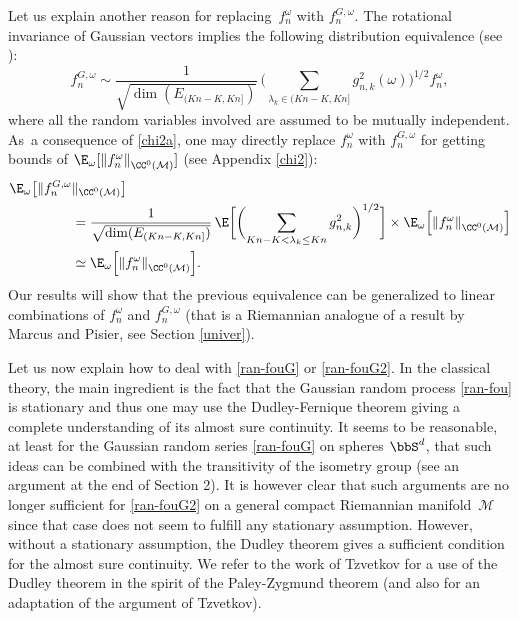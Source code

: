 Let us explain another reason for replacing~$f_n^\omega$ with $f_n^{G,\omega}$. The rotational invariance of Gaussian vectors implies the following distribution equivalence (see \cite[p.\,2731]{imek-aif}):
\begin{equation}\label{chi2a}
f_n^{G,\omega} \sim \frac{1}{\sqrt{\dim(E_{(Kn-K,Kn]})}}\,\biggl(\sum_{\lambda_k\in (Kn-K,Kn]} g_{n,k}^2(\omega)\biggr)^{1/2} f_n^\omega,
\end{equation}
where all the random variables involved are assumed to be mutually independent.
As~a consequence of \eqref{chi2a}, one may directly replace $f_n^{\omega}$ with $f_n^{G,\omega}$ for getting bounds of $\E_\omega[\left\Vert f_n^\omega \right\Vert_{\CC^0(\mathcal{M})}]$ (see Appendix \ref{chi2}):
\begin{align*}\nonumber
\E_{\omega}\bigl[\Vert f_n^{G,\omega}&\Vert_{\CC^0{(\mathcal{M})}} \bigr]\\
& = \frac{1}{\sqrt{\dim(E_{(Kn-K,Kn]})}}\,\E\biggl[\biggl(\sum_{Kn-K<\lambda_k\leq Kn} g_{n,k}^2\biggr)^{1/2} \biggr]\times \E_\omega\Bigl[\left\Vert f_n^{\omega}\right\Vert_{\CC^0{(\mathcal{M})}} \Bigr]\\
& \simeq \E_{\omega}\Bigl[\left\Vert f_n^{\omega}\right\Vert_{\CC^0{(\mathcal{M})}} \Bigr].
\end{align*}
Our results will show that the previous equivalence can be generalized to linear combinations of $f_n^\omega$ and $f_n^{G,\omega}$ (that is a Riemannian analogue of a result by Marcus and Pisier, see Section \ref{univer}).

Let us now explain how to deal with \eqref{ran-fouG} or \eqref{ran-fouG2}.
In the classical theory, the main ingredient is the fact that the Gaussian random process \eqref{ran-fou} is stationary and thus one may use the Dudley-Fernique theorem giving a complete understanding of its almost sure continuity.
It seems to be reasonable, at least for the Gaussian random series \eqref{ran-fouG} on spheres $\bbS^d$, that such ideas can be combined with the transitivity of the isometry group (see an argument at the end of Section 2).
It is however clear that such arguments are no longer sufficient for \eqref{ran-fouG2} on a general compact Riemannian manifold~$\mathcal{M}$ since that case does not seem to fulfill any stationary assumption. However, without a stationary assumption, the Dudley theorem \cite{dudley1967} gives a sufficient condition for the almost sure continuity. We refer to the work of Tzvetkov \cite{Tzvetkov4} for a use of the Dudley theorem in the spirit of the Paley-Zygmund theorem (and also \cite[Annex\,6]{randomh} for an adaptation of the argument of Tzvetkov).

